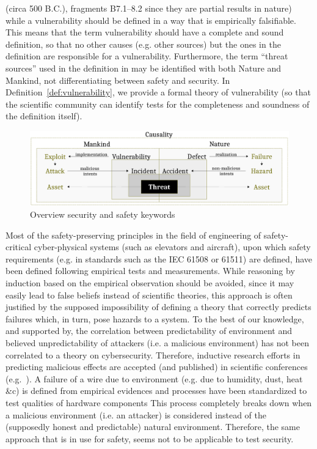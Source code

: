 \begin{itemize}
{		(circa 500 B.C.), fragments B7.1–8.2
		\autocite{Hakim2016philosophy}} since they are partial results in nature) 
		while a vulnerability should
		be defined in a way that is empirically falsifiable. This means
		that the term vulnerability should have a complete and sound
		definition, so that no other causes (e.g.  other sources) but
		the ones in the definition are responsible for a vulnerability.
		Furthermore, the term ``threat sources'' used in the definition
		in\autocite{cnssi20104009} may be identified with both Nature
		and Mankind, not differentiating between safety and security.
		In Definition~\ref{def:vulnerability}, we provide a formal
		theory of vulnerability (so that the scientific community can
		identify tests for the completeness and soundness of the
		definition itself).
\end{itemize}

\begin{figure}[t]
	\centering
	\includegraphics[width=\textwidth]{safety-security.pdf}
	\caption{Overview security and safety keywords}
	\label{fig:safety-security}
\end{figure}

Most of the safety-preserving principles in the field of engineering of
safety-critical cyber-physical systems (such as elevators and aircraft), upon
which safety requirements (e.g. in standards such as the IEC 61508 or 61511\autocite{IEC201761511}) are defined, have
been defined following empirical tests and measurements. While reasoning by
induction based on the empirical observation should be avoided, since it may
easily lead to false beliefs instead of scientific theories, this approach is
often justified by the supposed impossibility of defining a theory that
correctly predicts failures which, in turn, pose hazards to a system. 
To the best of our knowledge, and supported by\autocite{Herley2016unfalsifiability}, the
correlation between predictability of environment and believed unpredictability
of attackers (i.e. a malicious
environment) has not been correlated to a theory on cybersecurity. 
Therefore, inductive research efforts in
predicting malicious effects are accepted (and published) in scientific
conferences (e.g.~\autocite{Rocchetto2014CSRF}). A failure of a wire due to
environment (e.g. due to humidity, dust, heat \&c) is defined from empirical
evidences and processes have been standardized to test qualities of hardware components
This process completely breaks down when a malicious environment (i.e. an attacker)
is considered instead of the (supposedly honest and predictable)
natural environment. Therefore, the same approach that is in use for safety,
seems not to be applicable to test security.

